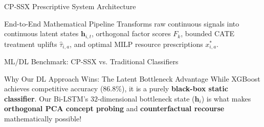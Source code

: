 \documentclass[aspectratio=169, 10pt]{beamer}
\begin{document}
\begin{frame}{CP-SSX Prescriptive System Architecture}
\begin{center}
{
  }
  \end{center}
  \vspace{0.1cm}
  \begin{alertblock}{End-to-End Mathematical Pipeline}
    Transforms raw continuous signals into continuous latent states $\mathbf{h}_{i,t}$, orthogonal factor scores $F_k$, bounded CATE treatment uplifts $\hat{\tau}_{i,a}$, and optimal MILP resource prescriptions $x_{i,a}^*$.
  \end{alertblock}
\end{frame}

\begin{frame}{ML/DL Benchmark: CP-SSX vs. Traditional Classifiers}
  \begin{center}
    \small
  \end{center}
  \vspace{0.2cm}
  \begin{alertblock}{Why Our DL Approach Wins: The Latent Bottleneck Advantage}
    While XGBoost achieves competitive accuracy ($86.8\%$), it is a purely \textbf{black-box static classifier}. Our Bi-LSTM's $32$-dimensional bottleneck state ($\mathbf{h}_i$) is what makes \textbf{orthogonal PCA concept probing} and \textbf{counterfactual recourse} mathematically possible!
  \end{alertblock}
\end{frame}
\end{document}
